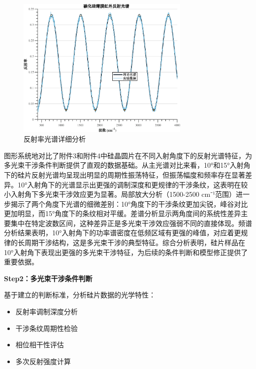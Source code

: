 \documentclass[withoutpreface,bwprint]{cumcmthesis}
\begin{document}
\begin{figure}[H]
\centering
\includegraphics[width=0.75\textwidth]{figures/reflectance_spectrum.eps}
\caption{反射率光谱详细分析}
\label{fig:反射率光谱分析}
\end{figure}

图形系统地对比了附件3和附件4中硅晶圆片在不同入射角度下的反射光谱特征，为多光束干涉条件判断提供了直观的数据基础。从主光谱对比来看，10°和15°入射角下的硅片反射光谱均呈现出明显的周期性振荡特征，但振荡幅度和频率存在显著差异。10°入射角下的光谱显示出更强的调制深度和更规律的干涉条纹，这表明在较小入射角下多光束干涉效应更为显著。局部放大分析（1500-2500 cm⁻¹范围）进一步揭示了两个角度下光谱的细微差别：10°角度下的干涉条纹更加尖锐，峰谷对比更加明显，而15°角度下的条纹相对平缓。差谱分析显示两角度间的系统性差异主要集中在特定波数区间，这种差异正是多光束干涉效应强弱不同的直接体现。频谱分析结果表明，10°入射角下的功率谱密度在低频区域有更强的峰值，对应着更规律的长周期干涉结构，这是多光束干涉的典型特征。综合分析表明，硅片样品在10°入射角下表现出更强的多光束干涉特征，为后续的条件判断和模型修正提供了重要依据。

\textbf{Step2：多光束干涉条件判断} 

基于建立的判断标准，分析硅片数据的光学特性：
\begin{itemize}[itemindent=2em]
\item 反射率调制深度分析
\item 干涉条纹周期性检验
\item 相位相干性评估
\item 多次反射强度计算
\end{itemize}
\end{document}
